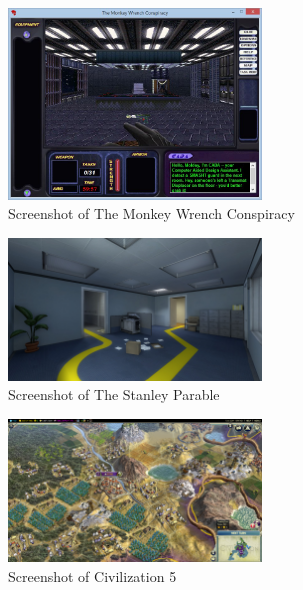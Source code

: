 \begin{figure}[h]
    \centering
    \includegraphics[width=0.6\textwidth]{figures/monkey}
    \caption{Screenshot of The Monkey Wrench Conspiracy}
    \label{fig:5}
\end{figure}

\begin{figure}[h]
    \centering
    \includegraphics[width=0.6\textwidth]{figures/stanley}
    \caption{Screenshot of The Stanley Parable}
    \label{fig:6}
\end{figure}

\begin{figure}[h]
    \centering
    \includegraphics[width=0.6\textwidth]{figures/civil}
    \caption{Screenshot of Civilization 5}
    \label{fig:7}
\end{figure}